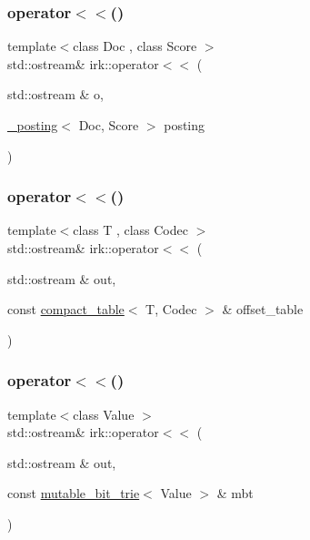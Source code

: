 \mbox{\label{namespaceirk_a94643c4295628e30b30002810c4a2327}} 
\subsubsection{\texorpdfstring{operator$<$$<$()}{operator<<()}\hspace{0.1cm}{\footnotesize\ttfamily [1/3]}}
{\footnotesize\ttfamily template$<$class Doc , class Score $>$ \\
std\+::ostream\& irk\+::operator$<$$<$ (\begin{DoxyParamCaption}\item[{std\+::ostream \&}]{o,  }\item[{\mbox{\hyperlink{structirk_1_1__posting}{\+\_\+posting}}$<$ Doc, Score $>$}]{posting }\end{DoxyParamCaption})}

\mbox{\label{namespaceirk_a9cf133b170be4f5de9135aa3936012e9}} 
\subsubsection{\texorpdfstring{operator$<$$<$()}{operator<<()}\hspace{0.1cm}{\footnotesize\ttfamily [2/3]}}
{\footnotesize\ttfamily template$<$class T , class Codec $>$ \\
std\+::ostream\& irk\+::operator$<$$<$ (\begin{DoxyParamCaption}\item[{std\+::ostream \&}]{out,  }\item[{const \mbox{\hyperlink{classirk_1_1compact__table}{compact\+\_\+table}}$<$ T, Codec $>$ \&}]{offset\+\_\+table }\end{DoxyParamCaption})}

\mbox{\label{namespaceirk_aac8001645bff72cf73bf0f87512c5ed4}} 
\subsubsection{\texorpdfstring{operator$<$$<$()}{operator<<()}\hspace{0.1cm}{\footnotesize\ttfamily [3/3]}}
{\footnotesize\ttfamily template$<$class Value $>$ \\
std\+::ostream\& irk\+::operator$<$$<$ (\begin{DoxyParamCaption}\item[{std\+::ostream \&}]{out,  }\item[{const \mbox{\hyperlink{classirk_1_1mutable__bit__trie}{mutable\+\_\+bit\+\_\+trie}}$<$ Value $>$ \&}]{mbt }\end{DoxyParamCaption})}

